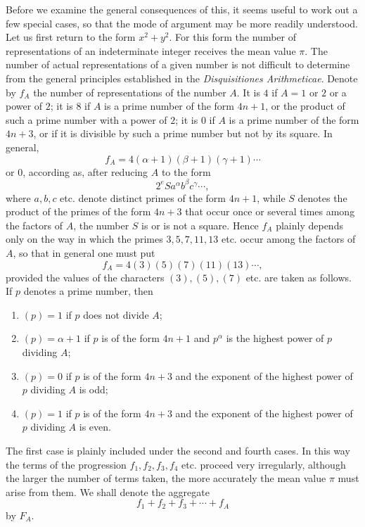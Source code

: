 \documentclass[12pt]{article}
\begin{document}
Before we examine the general consequences of this, it seems useful to work out a few special cases, so that the mode of argument may be more readily understood. Let us first return to the form $x^2+y^2$. For this form the number of representations of an indeterminate integer receives the mean value $\pi$. The number of actual representations of a given number is not difficult to determine from the general principles established in the \emph{Disquisitiones Arithmeticae}. Denote by $f_A$ the number of representations of the number $A$. It is $4$ if $A=1$ or $2$ or a power of $2$; it is $8$ if $A$ is a prime number of the form $4n+1$, or the product of such a prime number with a power of $2$; it is $0$ if $A$ is a prime number of the form $4n+3$, or if it is divisible by such a prime number but not by its square. In general,
\[
f_A=4(\alpha+1)(\beta+1)(\gamma+1)\cdots
\]
or $0$, according as, after reducing $A$ to the form
\[
2^e S a^\alpha b^\beta c^\gamma\cdots,
\]
where $a,b,c$ etc. denote distinct primes of the form $4n+1$, while $S$ denotes the product of the primes of the form $4n+3$ that occur once or several times among the factors of $A$, the number $S$ is or is not a square. Hence $f_A$ plainly depends only on the way in which the primes $3,5,7,11,13$ etc. occur among the factors of $A$, so that in general one must put
\[
f_A=4(3)(5)(7)(11)(13)\cdots,
\]
provided the values of the characters $(3),(5),(7)$ etc. are taken as follows. If $p$ denotes a prime number, then

\begin{enumerate}[label=\textit{\roman*.},leftmargin=2.2em]
\item $(p)=1$ if $p$ does not divide $A$;
\item $(p)=\alpha+1$ if $p$ is of the form $4n+1$ and $p^\alpha$ is the highest power of $p$ dividing $A$;
\item $(p)=0$ if $p$ is of the form $4n+3$ and the exponent of the highest power of $p$ dividing $A$ is odd;
\item $(p)=1$ if $p$ is of the form $4n+3$ and the exponent of the highest power of $p$ dividing $A$ is even.
\end{enumerate}

The first case is plainly included under the second and fourth cases. In this way the terms of the progression $f_1,f_2,f_3,f_4$ etc. proceed very irregularly, although the larger the number of terms taken, the more accurately the mean value $\pi$ must arise from them. We shall denote the aggregate
\[
f_1+f_2+f_3+\cdots+f_A
\]
by $F_A$.
\end{document}
